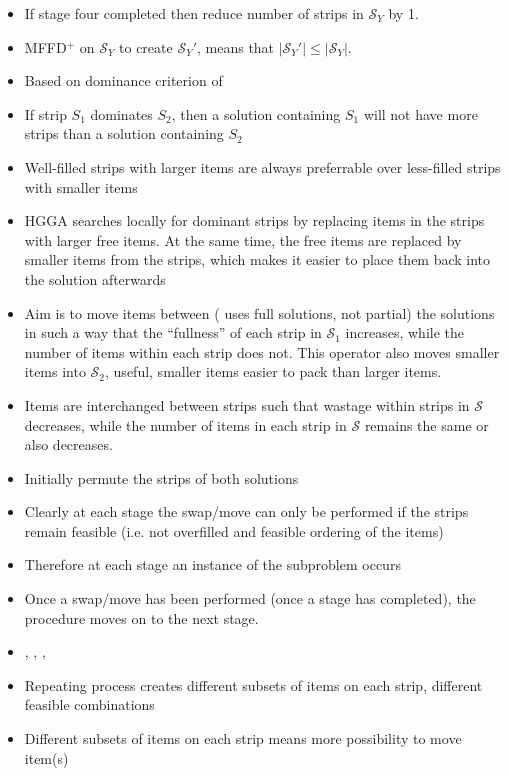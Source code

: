 \documentclass{elsarticle}
\begin{document}
\begin{itemize}
	\item If stage four completed then reduce number of strips in $\mathcal{S}_Y$ by 1.
	\item MFFD$^+$ on $\mathcal{S}_Y$ to create $\mathcal{S}_Y'$, means that $|\mathcal{S}_Y'| \leq |\mathcal{S}_Y|$.
	\item Based on dominance criterion of \cite{martello1990b}
	\item If strip $S_1$ dominates $S_2$, then a solution containing $S_1$ will not have more strips than a solution containing $S_2$
	\item Well-filled strips with larger items are always preferrable over less-filled strips with smaller items \cite{levine2004}
	\item HGGA \cite{falkenauer1996} searches locally for dominant strips by replacing items in the strips with larger free items. At the same time, the free items are replaced by smaller items from the strips, which makes it easier to place them back into the solution afterwards
	\item Aim is to move items between (\cite{lewis2009} uses full solutions, not partial) the solutions in such a way that the ``fullness'' of each strip in $\mathcal{S}_1$ increases, while the number of items within each strip does not. This operator also moves smaller items into $\mathcal{S}_2$, useful, smaller items easier to pack than larger items.
	\item Items are interchanged between strips such that wastage within strips in $\mathcal{S}$ decreases, while the number of items in each strip in $\mathcal{S}$ remains the same or also decreases. \cite{lewis2017}
	\item Initially permute the strips of both solutions
	\item Clearly at each stage the swap/move can only be performed if the strips remain feasible (i.e. not overfilled and feasible ordering of the items)
	\item Therefore at each stage an instance of the subproblem occurs
	\item Once a swap/move has been performed (once a stage has completed), the procedure moves on to the next stage.
	\item \cite{lewis2009}, \cite{levine2004}, \cite{falkenauer1996}, \cite{martello1990b}
	\item Repeating process creates different subsets of items on each strip, different feasible combinations
	\item Different subsets of items on each strip means more possibility to move item(s)

\end{itemize}
\end{document}
